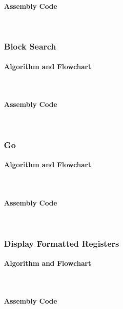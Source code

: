 \documentclass[12pt]{article}
\begin{document}
			\paragraph{Assembly Code}~\\				
			
			\subsubsection{Block Search}
			\paragraph{Algorithm and Flowchart}~\\
			\paragraph{Assembly Code}~\\				
			
			\subsubsection{Go}
			\paragraph{Algorithm and Flowchart}~\\
			\paragraph{Assembly Code}~\\				
			
			\subsubsection{Display Formatted Registers}
			\paragraph{Algorithm and Flowchart}~\\
			\paragraph{Assembly Code}~\\				
			
\end{document}
